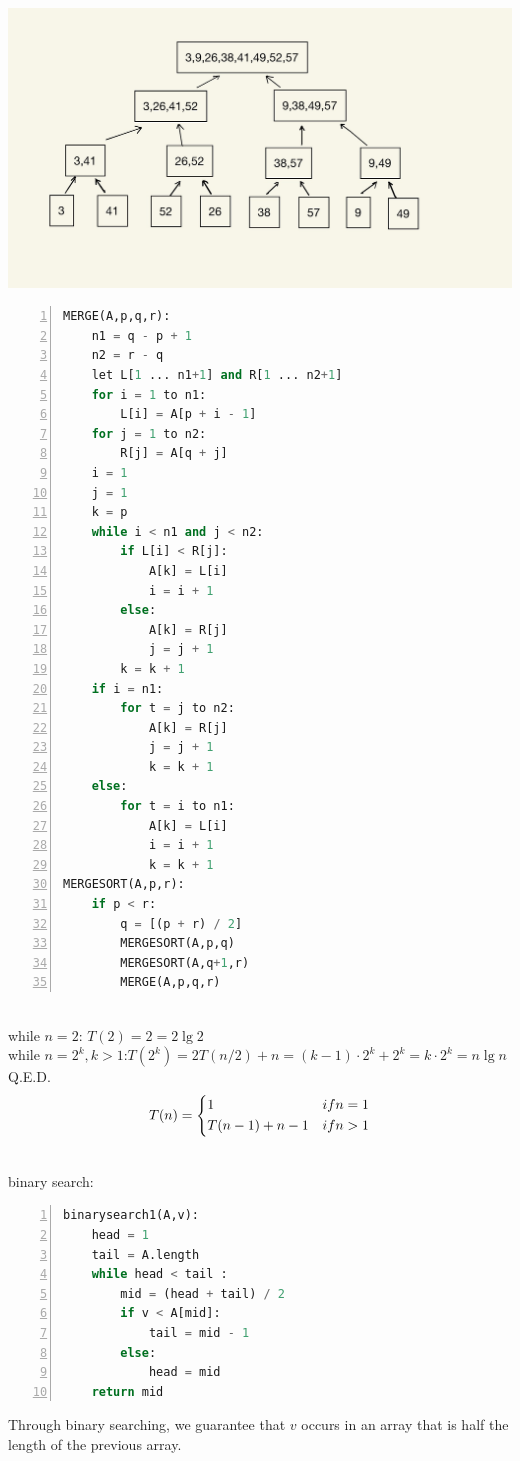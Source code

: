 \\
\includegraphics[scale=0.2]{sections/2/exercise2-3-1.jpeg}\\


\begin{lstlisting}[language=Python,numbers=left,numberstyle=\normalsize]
MERGE(A,p,q,r):
    n1 = q - p + 1
    n2 = r - q
    let L[1 ... n1+1] and R[1 ... n2+1]
    for i = 1 to n1:
        L[i] = A[p + i - 1]
    for j = 1 to n2:
        R[j] = A[q + j]
    i = 1
    j = 1
    k = p
    while i < n1 and j < n2:
        if L[i] < R[j]:
            A[k] = L[i]
            i = i + 1
        else:
            A[k] = R[j]
            j = j + 1
        k = k + 1
    if i = n1:
        for t = j to n2:
            A[k] = R[j]
            j = j + 1
            k = k + 1
    else:
        for t = i to n1:
            A[k] = L[i]
            i = i + 1
            k = k + 1
MERGESORT(A,p,r):
    if p < r:
        q = [(p + r) / 2]
        MERGESORT(A,p,q)
        MERGESORT(A,q+1,r)
        MERGE(A,p,q,r)
\end{lstlisting}


\\
while $ n=2 $: $ T(2)=2=2\lg 2 $\\
while $ n=2^k , k>1 $:$ T(2^k)=2T(n/2)+n=(k-1)\cdot 2^k +2^k=k\cdot 2^k=n\lg n$\\
Q.E.D.\\


\begin{align}
T(n)=\begin{dcases}
    1 & if n = 1\\
    T(n - 1) + n - 1 & if n > 1
\end{dcases}\notag
\end{align}


\\
binary search:
\begin{lstlisting}[language=Python,numbers=left,numberstyle=\normalsize]
binarysearch1(A,v):
    head = 1
    tail = A.length
    while head < tail :
        mid = (head + tail) / 2
        if v < A[mid]:
            tail = mid - 1
        else:
            head = mid
    return mid
\end{lstlisting}
Through binary searching, we guarantee that $ v $ occurs 
in an array that is half the length of the previous array.\\


